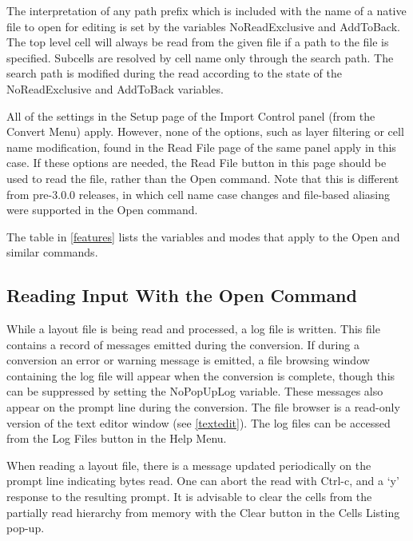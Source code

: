 The interpretation of any path prefix which is included with the name
of a native file to open for editing is set by the variables {\et
NoReadExclusive} and {\et AddToBack}.  The top level cell will always
be read from the given file if a path to the file is specified. 
Subcells are resolved by cell name only through the search path.  The
search path is modified during the read according to the state of the
{\et NoReadExclusive} and {\et AddToBack} variables.

All of the settings in the {\cb Setup} page of the {\cb Import
Control} panel (from the {\cb Convert Menu}) apply.  However, none of
the options, such as layer filtering or cell name modification, found
in the {\cb Read File} page of the same panel apply in this case.  If
these options are needed, the {\cb Read File} button in this page
should be used to read the file, rather than the {\cb Open} command. 
Note that this is different from pre-3.0.0 releases, in which cell
name case changes and file-based aliasing were supported in the {\cb
Open} command.

The table in \ref{features} lists the variables and modes that apply
to the {\cb Open} and similar commands.

\subsection{Reading Input With the Open Command}

While a layout file is being read and processed, a log file is
written.  This file contains a record of messages emitted during the
conversion.  If during a conversion an error or warning message is
emitted, a file browsing window containing the log file will appear
when the conversion is complete, though this can be suppressed by
setting the {\et NoPopUpLog} variable.  These messages also appear on
the prompt line during the conversion.  The file browser is a
read-only version of the text editor window (see \ref{textedit}).  The
log files can be accessed from the {\cb Log Files} button in the {\cb
Help Menu}.

When reading a layout file, there is a message updated periodically
on the prompt line indicating bytes read.  One can abort the read with
{\kb Ctrl-c}, and a `y' response to the resulting prompt.  It is
advisable to clear the cells from the partially read hierarchy from
memory with the {\cb Clear} button in the {\cb Cells Listing} pop-up.

